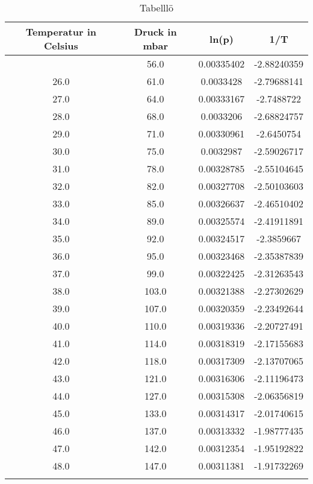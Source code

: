 \documentclass[
  captions=tableheading,
]{scrartcl}
\begin{document}
\begin{table}
  \caption{Tabelllö}
  \label{tab:Tabellö}
\begin{tabular}{c c c c}
Temperatur in Celsius& Druck in mbar&ln(p)&1/T\\

 \midrule
{ 25.0    &    56.0    &    0.00335402    &    -2.88240359\\
26.0    &    61.0    &    0.0033428    &    -2.79688141\\
27.0    &    64.0    &    0.00333167    &    -2.7488722\\
28.0    &    68.0    &    0.0033206    &    -2.68824757\\
29.0    &    71.0    &    0.00330961    &    -2.6450754\\
30.0    &    75.0    &    0.0032987    &    -2.59026717\\
31.0    &    78.0    &    0.00328785    &    -2.55104645\\
32.0    &    82.0    &    0.00327708    &    -2.50103603\\
33.0    &    85.0    &    0.00326637    &    -2.46510402\\
34.0    &    89.0    &    0.00325574    &    -2.41911891\\
35.0    &    92.0    &    0.00324517    &    -2.3859667\\
36.0    &    95.0    &    0.00323468    &    -2.35387839\\
37.0    &    99.0    &    0.00322425    &    -2.31263543\\
38.0    &    103.0    &    0.00321388    &    -2.27302629\\
39.0    &    107.0    &    0.00320359    &    -2.23492644\\
40.0    &    110.0    &    0.00319336    &    -2.20727491\\
41.0    &    114.0    &    0.00318319    &    -2.17155683\\
42.0    &    118.0    &    0.00317309    &    -2.13707065\\
43.0    &    121.0    &    0.00316306    &    -2.11196473\\
44.0    &    127.0    &    0.00315308    &    -2.06356819\\
45.0    &    133.0    &    0.00314317    &    -2.01740615\\
46.0    &    137.0    &    0.00313332    &    -1.98777435\\
47.0    &    142.0    &    0.00312354    &    -1.95192822\\
48.0    &    147.0    &    0.00311381    &    -1.91732269\\
}
\end{tabular}
\end{table}
\end{document}
